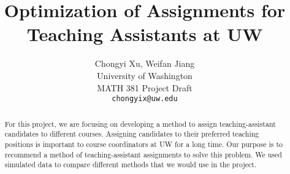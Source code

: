 \documentclass[twoside,twocolumn]{article}
\title{\LARGE \bf
    Optimization of Assignments for Teaching Assistants at UW
    }
\author{ \parbox{3 in}{\centering Chongyi Xu, Weifan Jiang \\
             University of Washington\\
             MATH 381 Project Draft\\
             {\tt\small chongyix@uw.edu}}
    }
\begin{document}
    \maketitle

    \begin{abstract}

    \indent For this project, we are focusing on developing a method to assign teaching-assistant candidates
    to different courses. Assigning candidates to their preferred teaching positions is important to 
    course coordinators at UW for a long time. Our purpose is to recommend a method of teaching-assistant
    assignments to solve this problem. We used simulated data to compare different methods that 
    we would use in the project.
        
    \end{abstract}

    \linespread{1.05} %
\end{document}
